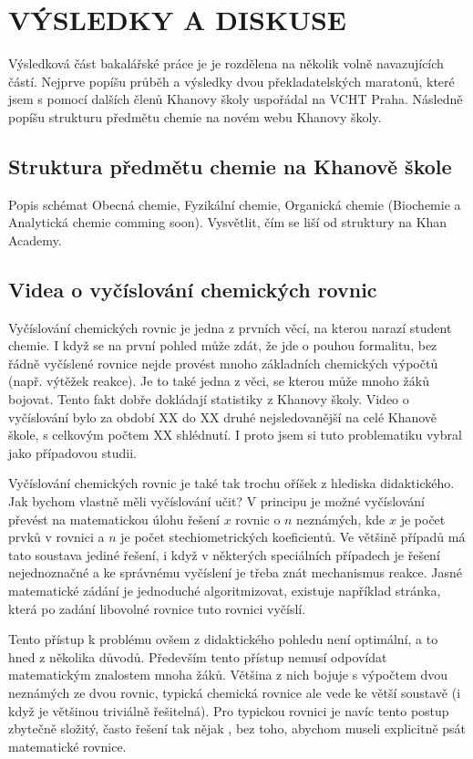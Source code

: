 \documentclass[a4paper, 12pt]{article}
\begin{document}
\newpage
\section{VÝSLEDKY A DISKUSE}
Výsledková část bakalářské práce je je rozdělena na několik volně navazujících částí.
Nejprve popíšu průběh a výsledky dvou překladatelských maratonů, které jsem s pomocí dalších členů Khanovy školy uspořádal na VCHT Praha. Následně popíšu strukturu předmětu chemie na novém webu Khanovy školy. 


\subsection{Struktura předmětu chemie na Khanově škole}
Popis schémat Obecná chemie, Fyzikální chemie, Organická chemie (Biochemie a Analytická chemie comming soon).
Vysvětlit, čím se liší od struktury na Khan Academy.

\subsection{Videa o vyčíslování chemických rovnic}
Vyčíslování chemických rovnic je jedna z prvních věcí, na kterou narazí student chemie. I když se na první pohled může zdát, že jde o pouhou formalitu, bez řádně vyčíslené rovnice nejde provést mnoho základních chemických výpočtů (např. výtěžek reakce). Je to také jedna z věci, se kterou může mnoho žáků bojovat. Tento fakt dobře dokládají statistiky z Khanovy školy. Video o vyčíslování bylo za období XX do XX druhé nejsledovanější na celé Khanově škole, s celkovým počtem XX shlédnutí. I proto jsem si tuto problematiku vybral jako případovou studii. 

Vyčíslování chemických rovnic je také tak trochu oříšek z hlediska didaktického. Jak bychom vlastně měli vyčíslování učit?
V principu je možné vyčíslování převést na matematickou úlohu řešení $x$ rovnic o $n$ neznámých, kde $x$ je počet prvků v rovnici a $n$ je počet stechiometrických koeficientů.\cite{marecek} Ve většině případů má tato soustava jediné řešení, i když v některých speciálních případech je řešení nejednoznačné a ke správnému vyčíslení je třeba znát mechanismus reakce. Jasné matematické zádání je jednoduché algoritmizovat, existuje například stránka, která po zadání libovolné rovnice tuto rovnici vyčíslí.\cite{}

Tento přístup k problému ovšem z didaktického pohledu není optimální, a to hned z několika důvodů.
Především tento přístup nemusí odpovídat matematickým znalostem mnoha žáků. Většina z nich bojuje s výpočtem dvou neznámých ze dvou rovnic, typická chemická rovnice ale vede ke větší soustavě (i když je většinou triviálně řešitelná).
Pro typickou rovnici je navíc tento postup zbytečně složitý, často řešení tak nějak , bez toho, abychom museli explicitně psát matematické rovnice. 
\end{document}
